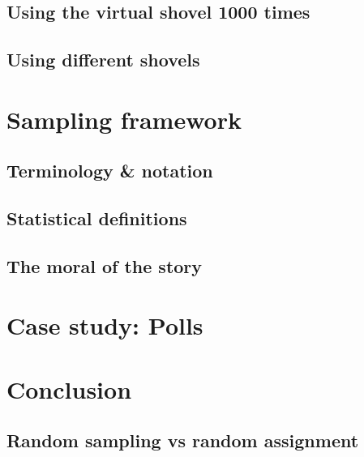 \documentclass[12pt, krantz2,]{krantz}
\begin{document}
\hypertarget{shovel-1000-times}{%
\subsection{Using the virtual shovel 1000 times}\label{shovel-1000-times}}

\hypertarget{different-shovels}{%
\subsection{Using different shovels}\label{different-shovels}}

\hypertarget{sampling-framework}{%
\section{Sampling framework}\label{sampling-framework}}

\hypertarget{terminology-and-notation}{%
\subsection{Terminology \& notation}\label{terminology-and-notation}}

\hypertarget{statistical-definitions}{%
\subsection{Statistical definitions}\label{statistical-definitions}}

\hypertarget{the-moral-of-the-story}{%
\subsection{The moral of the story}\label{the-moral-of-the-story}}

\hypertarget{sampling-case-study}{%
\section{Case study: Polls}\label{sampling-case-study}}

\hypertarget{sampling-conclusion}{%
\section{Conclusion}\label{sampling-conclusion}}

\hypertarget{sampling-conclusion-sampling-vs-assignment}{%
\subsection{Random sampling vs random assignment}\label{sampling-conclusion-sampling-vs-assignment}}
\end{document}
